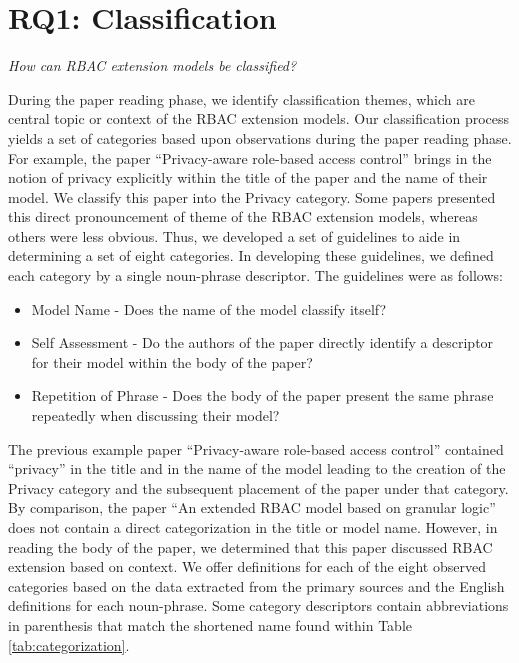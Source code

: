
\section{RQ1: Classification} \label{sec:categorization}

\textit{How can RBAC extension models be classified?}

During the paper reading phase, we identify classification themes, which are
central topic or context of the RBAC extension models. Our classification process
yields a set of categories based upon observations during the paper reading phase.
For example, the paper ``Privacy-aware role-based access control'' \cite{ni2010privacy} brings in the notion of privacy explicitly within the title of the paper and the name of their model. We classify this paper into the Privacy category. Some papers presented this direct pronouncement of theme of the RBAC extension models, whereas others were less obvious.
Thus, we developed a set of guidelines to aide in determining a set of eight categories. 
In developing these guidelines, we defined each category by a single noun-phrase descriptor.
The guidelines were as follows:

\begin{itemize}
\item Model Name - Does the name of the model classify itself?
\item Self Assessment - Do the authors of the paper directly identify a descriptor for their model within the body of the paper?
\item Repetition of Phrase - Does the body of the paper present the same phrase repeatedly when discussing their model?
\end{itemize}

The previous example paper ``Privacy-aware role-based access control'' \cite{ni2010privacy} contained ``privacy'' in
the title and in the name of the model leading to the creation of the Privacy category and the subsequent placement of the paper under that category.
By comparison, the paper ``An extended RBAC model based on granular logic'' \cite{jian2008extended} does not contain a direct categorization in the title or model name. However, in reading the body of the paper, we determined that this paper discussed RBAC extension based on context. 
We offer definitions for each of the eight observed categories based on the data extracted from the primary sources and the English definitions for each noun-phrase. 
Some category descriptors contain abbreviations in parenthesis that match the shortened name found within Table \ref{tab:categorization}.

